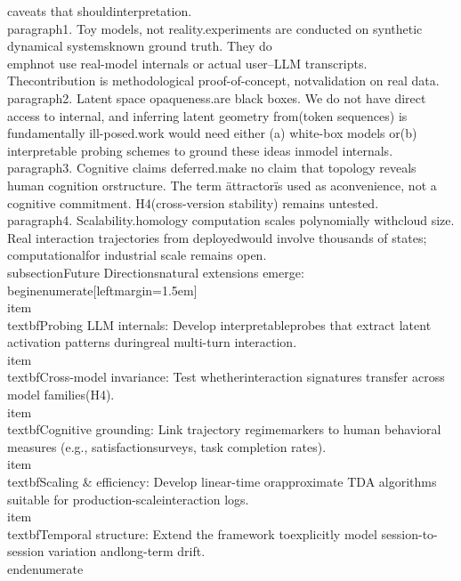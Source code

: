 \documentclass[11pt]{article}
\begin{document}
caveats that should\nguide interpretation.\n\n\\paragraph{1. Toy models, not reality.}\nThe experiments are conducted on synthetic dynamical systems\nwith known ground truth. They do \\emph{not} use real\nfrontier-model internals or actual user--LLM transcripts. The\nintended contribution is methodological proof-of-concept, not\nempirical validation on real data.\n\n\\paragraph{2. Latent space opaqueness.}\nLLMs are black boxes. We do not have direct access to internal\nrepresentations, and inferring latent geometry from\nobservables (token sequences) is fundamentally ill-posed.\nFuture work would need either (a) white-box models or\n(b) interpretable probing schemes to ground these ideas in\nreal model internals.\n\n\\paragraph{3. Cognitive claims deferred.}\nWe make no claim that topology reveals human cognition or\nneural structure. The term \"attractor\" is used as a\nmathematical convenience, not a cognitive commitment. H4\n(cross-version stability) remains untested.\n\n\\paragraph{4. Scalability.}\nPersistent homology computation scales polynomially with\npoint cloud size. Real interaction trajectories from deployed\nLLMs would involve thousands of states; computational\nfeasibility for industrial scale remains open.\n\n\\subsection{Future Directions}\n\nSeveral natural extensions emerge:\n\\begin{enumerate}[leftmargin=1.5em]\n  \\item \\textbf{Probing LLM internals}: Develop interpretable\n        probes that extract latent activation patterns during\n        real multi-turn interaction.\n  \\item \\textbf{Cross-model invariance}: Test whether\n        interaction signatures transfer across model families\n        (H4).\n  \\item \\textbf{Cognitive grounding}: Link trajectory regime\n        markers to human behavioral measures (e.g., satisfaction\n        surveys, task completion rates).\n  \\item \\textbf{Scaling & efficiency}: Develop linear-time or\n        approximate TDA algorithms suitable for production-scale\n        interaction logs.\n  \\item \\textbf{Temporal structure}: Extend the framework to\n        explicitly model session-to-session variation and\n        long-term drift.\n\\end{enumerate}\n\n%
\end{document}
